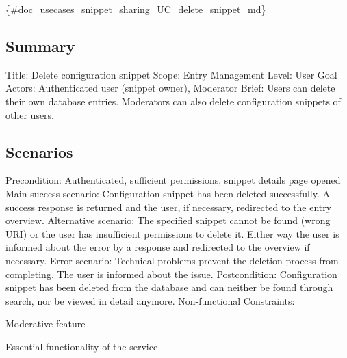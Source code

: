 \{\#doc\+\_\+usecases\+\_\+snippet\+\_\+sharing\+\_\+\+U\+C\+\_\+delete\+\_\+snippet\+\_\+md\}

\subsection*{Summary}

Title\+: Delete configuration snippet Scope\+: Entry Management Level\+: User Goal Actors\+: Authenticated user (snippet owner), Moderator Brief\+: Users can delete their own database entries. Moderators can also delete configuration snippets of other users.

\subsection*{Scenarios}

Precondition\+: Authenticated, sufficient permissions, snippet details page opened Main success scenario\+: Configuration snippet has been deleted successfully. A success response is returned and the user, if necessary, redirected to the entry overview. Alternative scenario\+: The specified snippet cannot be found (wrong U\+R\+I) or the user has insufficient permissions to delete it. Either way the user is informed about the error by a response and redirected to the overview if necessary. Error scenario\+: Technical problems prevent the deletion process from completing. The user is informed about the issue. Postcondition\+: Configuration snippet has been deleted from the database and can neither be found through search, nor be viewed in detail anymore. Non-\/functional Constraints\+:
\begin{DoxyItemize}
\item Moderative feature
\item Essential functionality of the service 
\end{DoxyItemize}
